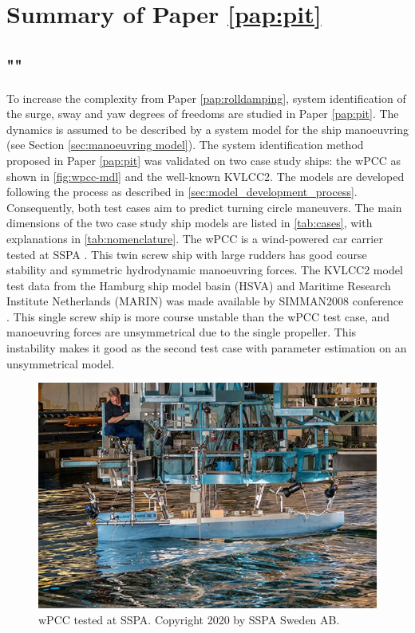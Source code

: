 \section{Summary of Paper \ref{pap:pit}}
\subsection*{""}
To increase the complexity from Paper \ref{pap:rolldamping}, system identification of the surge, sway and yaw
degrees of freedoms are studied in Paper \ref{pap:pit}. The dynamics is assumed to be described by a system model for the ship manoeuvring (see Section \ref{sec:manoeuvring model}). The system identification method proposed in Paper \ref{pap:pit} was validated on two case study ships: the wPCC as shown in \autoref{fig:wpcc-mdl} and the well-known KVLCC2. The models are developed following the process as described in \autoref{sec:model_development_process}. Consequently, both test cases aim to predict turning circle maneuvers. The main dimensions of the two case study ship models are listed in \autoref{tab:cases}, with explanations in \autoref{tab:nomenclature}. The wPCC is a wind-powered car carrier tested at SSPA \cite{alexandersson_wpcc_2022}. This twin screw ship with large rudders has good course stability and symmetric hydrodynamic manoeuvring forces. The KVLCC2 model test data from the Hamburg ship model basin (HSVA) and Maritime Research Institute Netherlands (MARIN) was made available by SIMMAN2008 conference \cite{stern_experience_2011}. This single screw ship is more course unstable than the wPCC test case, and manoeuvring forces are unsymmetrical due to the single propeller. This instability makes it good as the second test case with parameter estimation on an unsymmetrical model.

\begin{figure}[!htb]
\centering
\includegraphics[width=\linewidth]{kappa/images/wpcc_mdl.png}
\caption{wPCC tested at SSPA. Copyright 2020 by SSPA Sweden AB.}
\label{fig:wpcc-mdl}
\end{figure}



